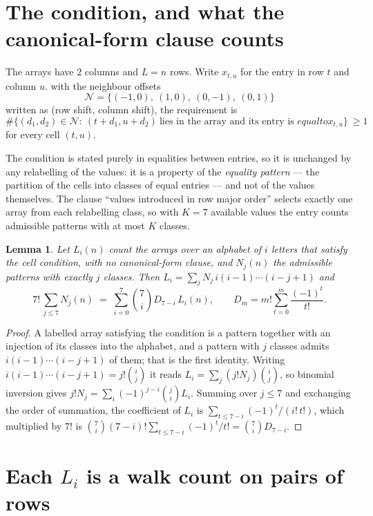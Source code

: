 \documentclass[11pt,a4paper]{article}
\theoremstyle{plain}
\newtheorem{lemma}[theorem]{Lemma}
\theoremstyle{definition}
\begin{document}
\section{The condition, and what the canonical-form clause counts}

The arrays have $2$ columns and $L=n$ rows. Write $x_{t,u}$ for the entry in
row $t$ and column $u$. with the neighbour offsets
\[
\mathcal N=\{(-1,0),\ (1,0),\ (0,-1),\ (0,1)\}
\]
written as (row shift, column shift), the requirement is
\begin{equation}\label{eq:loc}
\#\bigl\{(d_1,d_2)\in\mathcal N:\ (t+d_1,u+d_2)\ \text{lies in the array and its entry is }
equal to x_{t,u}\bigr\}\ \ge1
\end{equation}
for every cell $(t,u)$.

The condition is stated purely in equalities between entries, so it is unchanged by any
relabelling of the values: it is a property of the \emph{equality pattern} --- the partition
of the cells into classes of equal entries --- and not of the values themselves. The clause
``values introduced in row major order'' selects exactly one array from each relabelling
class, so with $K=7$ available values the entry counts admissible patterns with at most $K$
classes.

\begin{lemma}\label{lem:inv}
Let $L_i(n)$ count the arrays over an alphabet of $i$ letters that satisfy the cell
condition, with no canonical-form clause, and $N_j(n)$ the admissible patterns with exactly
$j$ classes. Then $L_i=\sum_j N_j\,i(i-1)\cdots(i-j+1)$ and
\[
7!\,\sum_{j\le 7}N_j(n)\;=\;\sum_{i=0}^{7}\binom{7}{i}D_{7-i}\,L_i(n),
\qquad D_m=m!\sum_{t=0}^{m}\frac{(-1)^t}{t!} .
\]
\end{lemma}

\begin{proof}
A labelled array satisfying the condition is a pattern together with an injection of its
classes into the alphabet, and a pattern with $j$ classes admits $i(i-1)\cdots(i-j+1)$ of
them; that is the first identity. Writing $i(i-1)\cdots(i-j+1)=j!\binom{i}{j}$ it reads
$L_i=\sum_j(j!N_j)\binom{i}{j}$, so binomial inversion gives
$j!N_j=\sum_i(-1)^{j-i}\binom{j}{i}L_i$. Summing over $j\le7$ and exchanging the
order of summation, the coefficient of $L_i$ is
$\sum_{t\le7-i}(-1)^t/(i!\,t!)$, which multiplied by $7!$ is
$\binom{7}{i}(7-i)!\sum_{t\le7-i}(-1)^t/t!=\binom{7}{i}D_{7-i}$.
\end{proof}

\section{Each $L_i$ is a walk count on pairs of rows}
\end{document}
